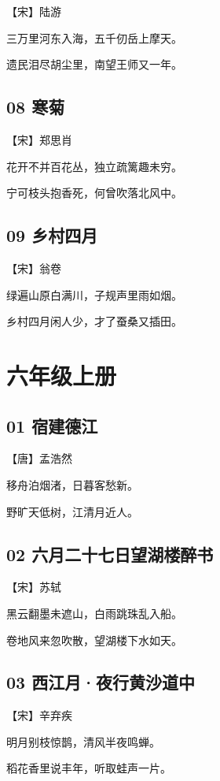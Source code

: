 \documentclass[a6paper, 12pt]{article}
\begin{document}
【宋】陆游

三万里河东入海，五千仞岳上摩天。

遗民泪尽胡尘里，南望王师又一年。

\subsection*{08 寒菊}

【宋】郑思肖

花开不并百花丛，独立疏篱趣未穷。

宁可枝头抱香死，何曾吹落北风中。

\subsection*{09 乡村四月}

【宋】翁卷

绿遍山原白满川，子规声里雨如烟。

乡村四月闲人少，才了蚕桑又插田。

\newpage

\section*{六年级上册}

\subsection*{01 宿建德江}

【唐】孟浩然

移舟泊烟渚，日暮客愁新。

野旷天低树，江清月近人。

\subsection*{02 六月二十七日望湖楼醉书}

【宋】苏轼

黑云翻墨未遮山，白雨跳珠乱入船。

卷地风来忽吹散，望湖楼下水如天。

\subsection*{03 西江月·夜行黄沙道中}

【宋】辛弃疾

明月别枝惊鹊，清风半夜鸣蝉。

稻花香里说丰年，听取蛙声一片。
\end{document}
